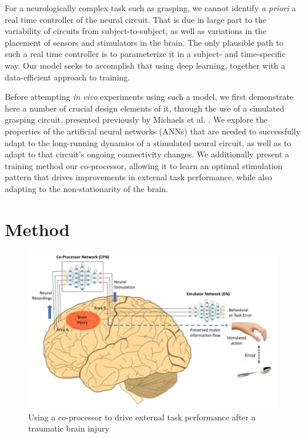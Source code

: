 \documentclass[12pt]{iopart}
\begin{document}
For a neurologically complex task such as grasping, we cannot identify
\textit{a priori} a real time controller of the neural circuit. That is
due in large part to the variability of circuits from subject-to-subject,
as well as variations in the placement of sensors and stimulators in the
brain. The only plausible path to such a real time controller is to parameterize
it in a subject- and time-specific way. Our model seeks to accomplish that using
deep learning, together with a data-efficient approach to training.

Before attempting \textit{in vivo} experiments using such a model, we first demonstrate
here a number of crucial design elements of it, through the use of a simulated
grasping circuit, presented previously by Michaels et al. \cite{michaels.mrnn}. We
explore the properties of the artificial neural networks (ANNs) that are needed to
successfully adapt to the long-running dynamics of a stimulated neural circuit,
as well as to adapt to that circuit's ongoing connectivity changes.
We additionally present a training method our co-processor, allowing it to learn
an optimal stimulation pattern that drives improvements in external task performance,
while also adapting to the non-stationarity of the brain.

\section{Method}

\begin{figure}
\includegraphics[width=\textwidth]{weill_arch.png}
\caption{Using a co-processor to drive external task performance after a traumatic brain injury}
\centering
\label{fig:weill}
\end{figure}
\end{document}
